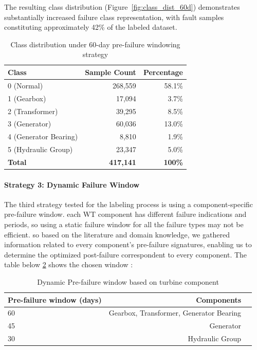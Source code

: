 \documentclass[12pt]{article}
\begin{document}
The resulting class distribution (Figure~\ref{fig:class_dist_60d}) demonstrates substantially increased failure class representation, with fault samples constituting approximately 42\% of the labeled dataset.


\begin{table}[htbp]
\centering
\caption{Class distribution under 60-day pre-failure windowing strategy}
\label{tab:class_dist_60d}
\begin{tabular}{lrr}
\toprule
\textbf{Class} & \textbf{Sample Count} & \textbf{Percentage} \\
\midrule
0 (Normal) & 268,559 & 58.1\% \\
1 (Gearbox) & 17,094 & 3.7\% \\
2 (Transformer) & 39,295 & 8.5\% \\
3 (Generator) & 60,036 & 13.0\% \\
4 (Generator Bearing) & 8,810 & 1.9\% \\
5 (Hydraulic Group) & 23,347 & 5.0\% \\
\midrule
\textbf{Total} & \textbf{417,141} & \textbf{100\%} \\
\bottomrule
\end{tabular}
\end{table}

\paragraph{Strategy 3: Dynamic Failure Window}
The third strategy tested for the labeling process is using a component-specific pre-failure window. each WT component has different failure indications and periods, so using a static failure window for all the failure types may not be efficient. so based on the literature and domain knowledge, we gathered information related to every component's pre-failure signatures, enabling us to determine the optimized post-failure correspondent to every component. The table below \ref{tab:dynamic_pre-failure-window_table} shows the chosen window :
\begin{table}[htbp]
\centering
\caption{Dynamic Pre-failure window based on turbine component}
\label{tab:dynamic_pre-failure-window_table}
\begin{tabular}{lrr}
\toprule
\textbf{Pre-failure window (days)} & \textbf{Components}\\
\midrule
60 & Gearbox, Transformer, Generator Bearing\\
45 & Generator\\
30 & Hydraulic Group\\
\bottomrule
\end{tabular}
\end{table}
\newpage
\end{document}
